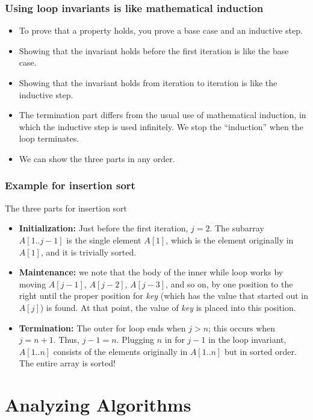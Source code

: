 \documentclass[notes,serif]{beamer}
\begin{document}
\begin{frame}
\frametitle{Using loop invariants is like mathematical induction}
\begin{itemize}
  \item To prove that a property holds, you prove a base case and an inductive step.
  \item Showing that the invariant holds before the first iteration is like the base case.
  \item Showing that the invariant holds from iteration to iteration is like the inductive
step.
  \item The termination part differs from the usual use of mathematical induction, in
which the inductive step is used infinitely. We stop the ``induction'' when the
loop terminates.
  \item We can show the three parts in any order.
\end{itemize}
\end{frame}

\begin{frame}
\frametitle{Example for insertion sort}
  \begin{exampleblock}{The three parts for insertion sort}
  \begin{itemize}
    \item {\bf Initialization:} Just before the first iteration, $j = 2$. The subarray $A[1 . . j-1]$
is the single element $A[1]$, which is the element originally in $A[1]$, and it is trivially sorted.
    \item {\bf Maintenance:}  we note that the body of the inner while loop works by moving
$A[j-1]$, $A[ j-2]$, $A[ j-3]$, and so on, by one position to the right until the proper position for {\em key} (which has the value that started out in $A[ j ]$) is found.  At that point, the value of {\em key} is placed into this position.
    \item {\bf Termination:} The outer for loop ends when $j > n$; this occurs when $j = n + 1$.
Thus, $j - 1 = n$. Plugging $n$ in for $j - 1$ in the loop invariant, $A[1 . . n]$ consists of the elements originally in $A[1 . . n]$ but in sorted order. The entire array is sorted!
  \end{itemize}
  \end{exampleblock}
\end{frame}

\section{Analyzing Algorithms}
\end{document}
